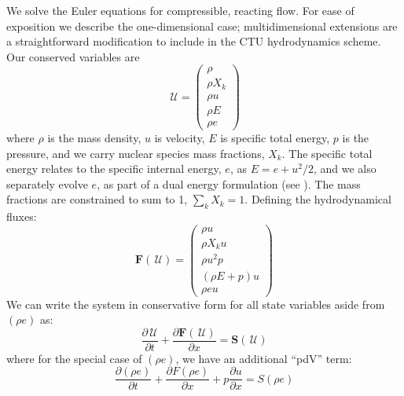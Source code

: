 \documentclass[times,preprint]{aastex631}
\newcommand{\ddx}[1]{{\frac{{\partial#1}}{\partial x}}}
\newcommand{\ddt}[1]{{\frac{{\partial#1}}{\partial t}}}
\newcommand{\Uc}{{\,\bm{\mathcal{U}}}}
\newcommand{\Fb}{\mathbf{F}}
\newcommand{\Sc}{\mathbf{S}}
\begin{document}
We solve the Euler equations for compressible, reacting flow.  For ease
of exposition we describe the one-dimensional case;
multidimensional extensions are a straightforward modification to
include in the CTU hydrodynamics scheme.  Our conserved variables are
\begin{equation}
  \Uc = \left ( \begin{array}{c}
           \rho \\
           \rho X_k \\
           \rho u \\
           \rho E \\
           \rho e \end{array}\right )
\end{equation}
where $\rho$ is the mass density, $u$ is velocity, $E$ is specific
total energy, $p$ is the pressure, and we carry nuclear species mass
fractions, $X_k$.  The specific total
energy relates to the specific internal energy, $e$, as $E = e + u^2/2$,
and we also separately evolve $e$, as part of a dual
energy formulation (see \citealt{bryan:1995,wdmergerI}).
 The mass fractions are constrained to sum to 1, $\sum_k X_k = 1$.
Defining the hydrodynamical fluxes:
\begin{equation}
  \Fb(\Uc) = \left ( \begin{array}{c}
         \rho u \\
         \rho X_k u \\
         \rho u^2 p \\
         (\rho E + p) u \\
         \rho e u \end{array}\right )
\end{equation}
We can write the system in conservative form for all state variables aside from $(\rho e)$ as:
\begin{equation}
  \ddt{\Uc} + \ddx{\Fb(\Uc)} = \Sc(\Uc)
\end{equation}
where for the special case of $(\rho e)$, we have an additional ``pdV'' term:
\begin{equation}
\ddt{(\rho e)} + \ddx{F(\rho e)} + p \ddx{u} = S(\rho e)
\end{equation}
\end{document}
